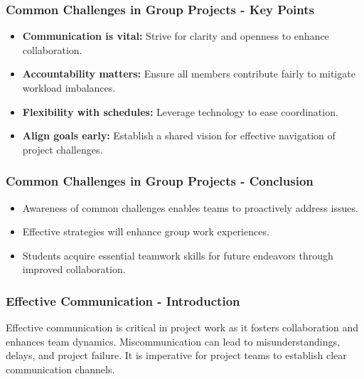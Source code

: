 \documentclass[aspectratio=169]{beamer}
\begin{document}
\begin{frame}[fragile]
  \frametitle{Common Challenges in Group Projects - Key Points}
  \begin{itemize}
    \item \textbf{Communication is vital:} Strive for clarity and openness to enhance collaboration.
    \item \textbf{Accountability matters:} Ensure all members contribute fairly to mitigate workload imbalances.
    \item \textbf{Flexibility with schedules:} Leverage technology to ease coordination.
    \item \textbf{Align goals early:} Establish a shared vision for effective navigation of project challenges.
  \end{itemize}
\end{frame}

\begin{frame}[fragile]
  \frametitle{Common Challenges in Group Projects - Conclusion}
  \begin{itemize}
    \item Awareness of common challenges enables teams to proactively address issues.
    \item Effective strategies will enhance group work experiences.
    \item Students acquire essential teamwork skills for future endeavors through improved collaboration.
  \end{itemize}
\end{frame}

\begin{frame}[fragile]
    \frametitle{Effective Communication - Introduction}
    Effective communication is critical in project work as it fosters collaboration and enhances team dynamics. Miscommunication can lead to misunderstandings, delays, and project failure. It is imperative for project teams to establish clear communication channels.
\end{frame}
\end{document}
